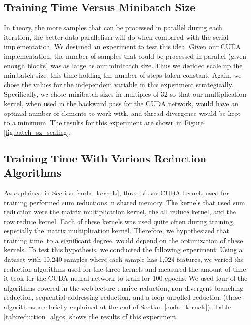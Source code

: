 \documentclass[11pt,a4paper]{article}
\begin{document}
\subsection{Training Time Versus Minibatch Size}
In theory, the more samples that can be processed in parallel during each iteration, the better data parallelism will do when compared with the serial implementation. We designed an experiment to test this idea. Given our CUDA implementation, the number of samples that could be processed in parallel (given enough blocks) was as large as our minibatch size. Thus we decided scale up the minibatch size, this time holding the number of steps taken constant. Again, we chose the values for the independent variable in this experiment strategically. Specifically, we chose minibatch sizes in multiples of 32 so that our multiplication kernel, when used in the backward pass for the CUDA network, would have an optimal number of elements to work with, and thread divergence would be kept to a minimum. The results for this experiment are shown in Figure \ref{fig:batch_sz_scaling}.

\subsection{Training Time With Various Reduction Algorithms} \label{reduction_algos}
As explained in Section \ref{cuda_kernels}, three of our CUDA kernels used for training performed sum reductions in shared memory. The kernels that used sum reduction were the matrix multiplication kernel, the all reduce kernel, and the row reduce kernel. Each of these kernels was used quite often during training, especially the matrix multiplication kernel. Therefore, we hypothesized that training time, to a significant degree, would depend on the optimization of these kernels. To test this hypothesis, we conducted the following experiment: Using a dataset with 10,240 samples where each sample has 1,024 features, we varied the reduction algorithms used for the three kernels and measured the amount of time it took for the CUDA neural network to train for 100 epochs. We used four of the algorithms covered in the web lecture \cite{choi_reductions}: naive reduction, non-divergent branching reduction, sequential addressing reduction, and a loop unrolled reduction (these algorithms are briefly explained at the end of Section \ref{cuda_kernels}). Table \ref{tab:reduction_algos} shows the results of this experiment. 
\end{document}
